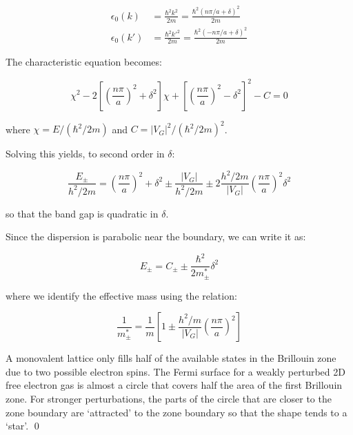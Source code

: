 \documentclass[12pt]{article}
\begin{document}
\begin{equation}
    \begin{split}
        \epsilon_{0}(k) &= \frac{\hbar^{2}k^{2}}{2m} = \frac{\hbar^{2}(n\pi/a + \delta)^{2}}{2m} \\
        \epsilon_{0}(k') &= \frac{\hbar^{2}k'^{2}}{2m} = \frac{\hbar^{2}(-n\pi/a + \delta)^{2}}{2m}
    \end{split}
\end{equation}

The characteristic equation becomes:

\begin{equation}
    \chi^{2} - 2\left[ \left( \frac{n\pi}{a} \right)^{2} + \delta^{2} \right] \chi + \left[ \left( \frac{n\pi}{a} \right)^{2} - \delta^{2} \right]^{2} - C = 0
\end{equation}

where $\chi = E/(\hbar^{2}/2m)$ and $C = |V_{G}|^{2}/(\hbar^{2}/2m)^{2}$.

Solving this yields, to second order in $\delta$:

\begin{equation}
    \frac{E_{\pm}}{h^{2}/2m} = \left( \frac{n\pi}{a} \right)^{2} + \delta^{2} \pm \frac{|V_{G}|}{h^{2}/2m} \pm 2\frac{h^{2}/2m}{|V_{G}|} \left( \frac{n\pi}{a} \right)^{2} \delta^{2}
\end{equation}

so that the band gap is quadratic in $\delta$.

Since the dispersion is parabolic near the boundary, we can write it as:

\begin{equation}
    E_{\pm} = C_{\pm} \pm \frac{\hbar^{2}}{2m^{*}_{\pm}}\delta^{2}
\end{equation}

where we identify the effective mass using the relation:

\begin{equation}
    \frac{1}{m^{*}_{\pm}} = \frac{1}{m} \left[ 1 \pm \frac{h^{2}/m}{|V_{G}|} \left( \frac{n\pi}{a} \right)^{2} \right]
\end{equation}

A monovalent lattice only fills half of the available states in the Brillouin zone due to two possible electron spins. The Fermi surface for a weakly perturbed 2D free electron gas is almost a circle that covers half the area of the first Brillouin zone. For stronger perturbations, the parts of the circle that are closer to the zone boundary are `attracted' to the zone boundary so that the shape tends to a `star'.
\qed
\end{document}

